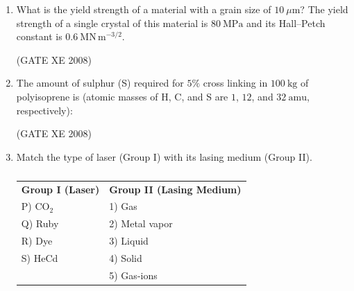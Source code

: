\documentclass[12pt]{article}
\begin{document}
\begin{enumerate}
(GATE XE 2008)

\item What is the yield strength of a material with a grain size of $10 \ \mu \mathrm{m}$? The yield strength of a single crystal of this material is $80 \ \mathrm{MPa}$ and its Hall–Petch constant is $0.6 \ \mathrm{MN \, m^{-3/2}}$.

\begin{enumerate}
\end{enumerate}

(GATE XE 2008)

\item The amount of sulphur (S) required for $5\%$ cross linking in $100 \ \mathrm{kg}$ of polyisoprene is (atomic masses of H, C, and S are $1$, $12$, and $32 \ \mathrm{amu}$, respectively):

\begin{enumerate}
\end{enumerate}

(GATE XE 2008)

\item Match the type of laser (Group I) with its lasing medium (Group II).

\begin{table}[H]     \centering     \caption{}     \label{}     \begin{tabular}{l l}
\textbf{Group I (Laser)} & \textbf{Group II (Lasing Medium)} \\
P) CO$_2$ & 1) Gas \\
Q) Ruby & 2) Metal vapor \\
R) Dye & 3) Liquid \\
S) HeCd & 4) Solid \\
 & 5) Gas-ions \\
\end{tabular} \end{table}


\end{enumerate}
\end{document}
